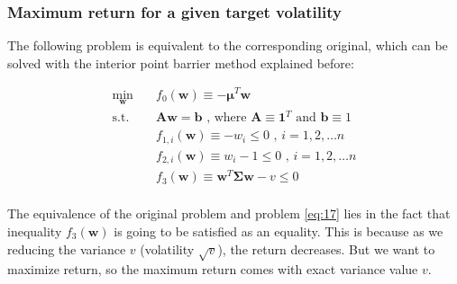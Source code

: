 \documentclass{beamer}
\begin{document}
\begin{frame}


\frametitle{\textbf{Maximum return for a given target volatility}}

\justifying
The following problem is equivalent to the corresponding original, which can be solved with the interior point barrier method explained before:

\justifying
\begin{equation}
\begin{aligned}
\label{eq:17}
\min_{\mathbf{w}} \quad & f_{0}\left(\mathbf{w}\right) \equiv - \boldsymbol\mu^{T} \mathbf{w} \\
\textrm{s.t.} \quad & \mathbf{A} \mathbf{w} = \mathbf{b}  \textrm{ , where } \mathbf{A} \equiv \mathbf{1}^{T} \textrm{ and } \mathbf{b} \equiv 1 \\
                             & f_{1,i}\left(\mathbf{w}\right) \equiv - w_{i} \leq 0 \textrm{ , } i = 1, 2, \dots n \\
                             & f_{2,i}\left(\mathbf{w}\right) \equiv w_{i} - 1 \leq 0 \textrm{ , } i = 1, 2, \dots n \\
                             & f_{3}\left(\mathbf{w}\right) \equiv \mathbf{w}^{T}\mathbf{\Sigma}\mathbf{w} - v \leq 0 \\
\end{aligned}
\end{equation}

\vspace{0.4cm}
\justifying
The equivalence of the original problem and problem \eqref{eq:17} lies in the fact that inequality $f_{3}\left(\mathbf{w}\right)$ is going to be satisfied as an equality. This is because as we reducing the variance $v$ (volatility $\sqrt{v}$), the return decreases. But we want to maximize return, so the maximum return comes with exact variance value $v$.

\end{frame}
\end{document}
